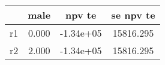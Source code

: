 \begin{table}[htbp]
\begin{tabular}{lccc} \hline \hline
 & male  & npv te  & se npv te  \\  \hline 
r1 &     0.000 & -1.34e+05 & 15816.295 \\  
r2 &     2.000 & -1.34e+05 & 15816.295 \\  
\hline \hline \end{tabular}
\end{table}
